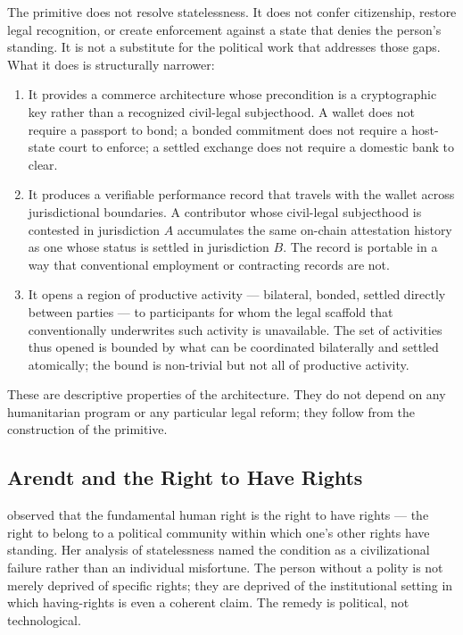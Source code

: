 \documentclass[11pt,a4paper]{article}
\theoremstyle{remark}
\begin{document}
The primitive does not resolve statelessness. It does not confer
citizenship, restore legal recognition, or create enforcement
against a state that denies the person's standing. It is not a
substitute for the political work that addresses those gaps.
What it does is structurally narrower:

\begin{enumerate}[label=(\alph*)]
  \item It provides a commerce architecture whose precondition is
    a cryptographic key rather than a recognized civil-legal
    subjecthood. A wallet does not require a passport to bond; a
    bonded commitment does not require a host-state court to
    enforce; a settled exchange does not require a domestic bank
    to clear.
  \item It produces a verifiable performance record that travels
    with the wallet across jurisdictional boundaries. A
    contributor whose civil-legal subjecthood is contested in
    jurisdiction $A$ accumulates the same on-chain attestation
    history as one whose status is settled in jurisdiction $B$.
    The record is portable in a way that conventional employment
    or contracting records are not.
  \item It opens a region of productive activity --- bilateral,
    bonded, settled directly between parties --- to participants
    for whom the legal scaffold that conventionally underwrites
    such activity is unavailable. The set of activities thus
    opened is bounded by what can be coordinated bilaterally and
    settled atomically; the bound is non-trivial but not all of
    productive activity.
\end{enumerate}

These are descriptive properties of the architecture. They do not
depend on any humanitarian program or any particular legal
reform; they follow from the construction of the primitive.

\subsection{Arendt and the Right to Have Rights}

\citet{arendt1951origins} observed that the fundamental human
right is the right to have rights --- the right to belong to a
political community within which one's other rights have
standing. Her analysis of statelessness named the condition as a
civilizational failure rather than an individual misfortune. The
person without a polity is not merely deprived of specific
rights; they are deprived of the institutional setting in which
having-rights is even a coherent claim. The remedy is political,
not technological.
\end{document}
